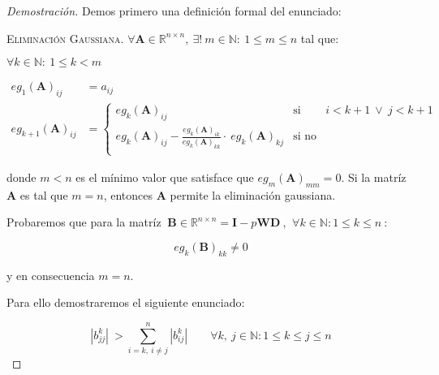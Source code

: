 \begin{proof}[Demostración] Demos primero una definición formal del enunciado:  
    
\vspace{2em}
\noindent \textsc{Eliminación Gaussiana}. $\forall \mathbf{A} \in \mathbb{R}^{n \times n},\ \exists!\ m \in \mathbb{N}:\ 1 \leq m \leq n$ tal que: 

\vspace{1em}
\noindent $\forall k \in \mathbb{N}:\ 1 \leq k < m$

\vspace{0.5em}
\begin{align*}
    eg_{1}(\mathbf{A})_{ij}  &= a_{ij}
    \\
    eg_{k+1}(\mathbf{A})_{ij} &=  
        \left\{ 
            \begin{array}{lcc}
                eg_{k}(\mathbf{A})_{ij}  &   \text{si}    & i < k+1 \ \vee \  j < k+1 \\
                eg_{k}(\mathbf{A})_{ij} - \frac {eg_{k}(\mathbf{A})_{ik}}{eg_{k}(\mathbf{A})_{kk}}\cdot \ eg_{k}(\mathbf{A})_{kj} & \text{si no} \\
            \end{array}
        \right.\ 
\end{align*}  

\vspace{1em}    
\noindent donde $m < n$ es el mínimo valor que satisface que $eg_{m}{(\mathbf{A})}_{mm} = 0$. Si la matríz $\mathbf{A}$ es tal que $m = n$, entonces $\mathbf{A}$ permite la eliminación gaussiana.

\vspace{3em}
\noindent Probaremos que para la matríz $\ \mathbf{B} \in \mathbb{R}^{n \times n} = \mathbf{I} - p\mathbf{W}\mathbf{D}\ $, $\ \forall k \in \mathbb{N}: 1 \leq k \leq n\ $: 

\begin{equation*}
eg_{k}{(\mathbf{B})}_{kk} \neq 0
\end{equation*}

\vspace{0.5em}
\noindent y en consecuencia $m = n$.


\vspace{2em}
\noindent Para ello demostraremos el siguiente enunciado:

\begin{equation*}
    |b^{k}_{jj}| \ > \sum_{i = k,\ i \neq j}^{n} |b^{k}_{ij}| \qquad \forall k,\ j \in \mathbb{N}: 1 \leq k \leq j \leq n
\end{equation*}


\end{proof}
